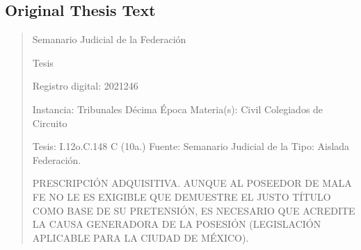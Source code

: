 \documentclass[11pt,a4paper]{article}
\begin{document}
\subsection{Original Thesis Text}

\begin{quote}
                                                   Semanario Judicial de la Federación

                                                Tesis

 Registro digital: 2021246

 Instancia: Tribunales             Décima Época                           Materia(s): Civil
 Colegiados de Circuito

 Tesis: I.12o.C.148 C (10a.)       Fuente: Semanario Judicial de la       Tipo: Aislada
                                   Federación.


PRESCRIPCIÓN ADQUISITIVA. AUNQUE AL POSEEDOR DE MALA FE NO LE ES EXIGIBLE
QUE DEMUESTRE EL JUSTO TÍTULO COMO BASE DE SU PRETENSIÓN, ES NECESARIO QUE
ACREDITE LA CAUSA GENERADORA DE LA POSESIÓN (LEGISLACIÓN APLICABLE PARA LA
CIUDAD DE MÉXICO).



\end{quote}
\end{document}
